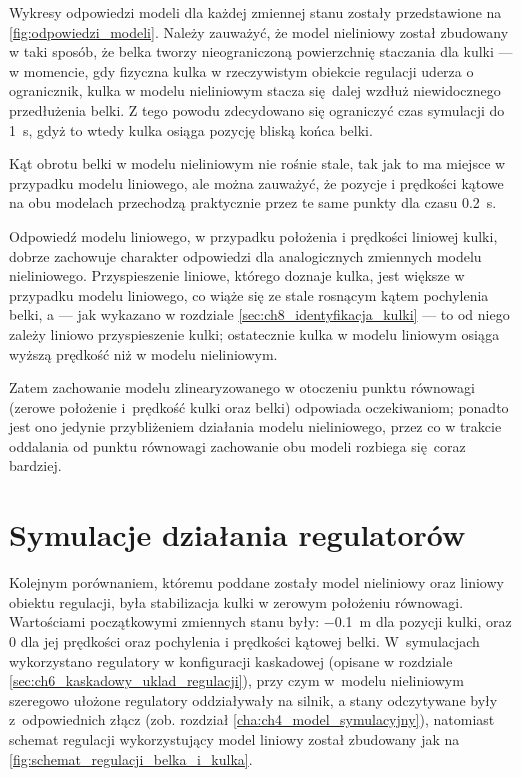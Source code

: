 Wykresy odpowiedzi modeli dla każdej zmiennej stanu zostały przedstawione na \cref{fig:odpowiedzi_modeli}. Należy zauważyć, że model nieliniowy został zbudowany w taki sposób, że belka tworzy nieograniczoną powierzchnię staczania dla kulki --- w momencie, gdy fizyczna kulka w rzeczywistym obiekcie regulacji uderza o ogranicznik, kulka w modelu nieliniowym stacza się dalej wzdłuż niewidocznego przedłużenia belki. 
Z tego powodu zdecydowano się ograniczyć czas symulacji do \SI{1}{\second}, gdyż to wtedy kulka osiąga pozycję bliską końca belki.

Kąt obrotu belki w modelu nieliniowym nie rośnie stale, tak jak to ma miejsce w przypadku modelu liniowego, ale można zauważyć, że pozycje i prędkości kątowe na obu modelach przechodzą praktycznie przez te same punkty dla czasu \SI{0.2}{\second}.

Odpowiedź modelu liniowego, w przypadku położenia i prędkości liniowej kulki, dobrze zachowuje charakter odpowiedzi dla analogicznych zmiennych modelu nieliniowego. Przyspieszenie liniowe, którego doznaje kulka, jest większe w przypadku modelu liniowego, co wiąże się ze stale rosnącym kątem pochylenia belki, a --- jak wykazano w rozdziale \ref{sec:ch8_identyfikacja_kulki} --- to od niego zależy liniowo przyspieszenie kulki; ostatecznie kulka w modelu liniowym osiąga wyższą prędkość niż w modelu nieliniowym.

Zatem zachowanie modelu zlinearyzowanego w otoczeniu punktu równowagi (zerowe położenie i~prędkość kulki oraz belki) odpowiada oczekiwaniom; ponadto jest ono jedynie przybliżeniem działania modelu nieliniowego, przez co w trakcie oddalania od punktu równowagi zachowanie obu modeli rozbiega się coraz bardziej.

\section{Symulacje działania regulatorów}
\label{sec:ch9_symulacje_regulatorow}

Kolejnym porównaniem, któremu poddane zostały model nieliniowy oraz liniowy obiektu regulacji, była stabilizacja kulki w zerowym położeniu równowagi. Wartościami początkowymi zmiennych stanu były: \SI{-0.1}{\meter} dla pozycji kulki, oraz \num{0} dla jej prędkości oraz pochylenia i prędkości kątowej belki. W~symulacjach wykorzystano regulatory w konfiguracji kaskadowej (opisane w rozdziale \ref{sec:ch6_kaskadowy_uklad_regulacji}), przy czym w~modelu nieliniowym szeregowo ułożone regulatory oddziaływały na silnik, a stany odczytywane były z~odpowiednich złącz (zob. rozdział \ref{cha:ch4_model_symulacyjny}), natomiast schemat regulacji wykorzystujący model liniowy został zbudowany jak na \cref{fig:schemat_regulacji_belka_i_kulka}.

